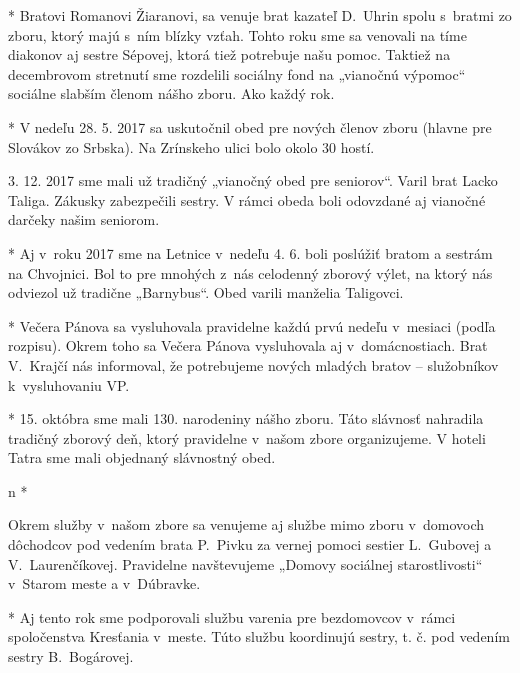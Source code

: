 * 
Bratovi Romanovi Žiaranovi, sa venuje brat kazateľ D.~Uhrin spolu s~bratmi zo zboru, ktorý majú s~ním blízky vzťah. Tohto roku sme sa venovali na tíme diakonov aj sestre Sépovej, ktorá tiež potrebuje našu pomoc.
Taktiež na decembrovom stretnutí sme rozdelili sociálny fond na „vianočnú výpomoc“ sociálne slabším členom nášho zboru. Ako každý rok.

* 
V nedeľu 28. 5. 2017 sa uskutočnil obed pre nových členov zboru (hlavne pre Slovákov zo Srbska). Na Zrínskeho ulici bolo okolo 30 hostí.

3. 12. 2017 sme mali už tradičný „vianočný obed pre seniorov“. Varil brat Lacko Taliga. Zákusky zabezpečili sestry. V rámci obeda boli odovzdané aj vianočné darčeky našim seniorom.

* 
Aj v~roku 2017 sme na Letnice v~nedeľu 4. 6.  boli poslúžiť bratom a sestrám na Chvojnici. Bol to pre mnohých z~nás celodenný zborový výlet, na ktorý nás odviezol už tradične „Barnybus“. Obed varili manželia Taligovci.

* 
Večera Pánova sa vysluhovala pravidelne každú prvú nedeľu v~mesiaci (podľa rozpisu). Okrem toho sa Večera Pánova vysluhovala aj v~domácnostiach. Brat V.~Krajčí nás informoval, že potrebujeme nových mladých bratov -- služobníkov k~vysluhovaniu VP.

* 
15. októbra sme mali 130. narodeniny nášho zboru. Táto slávnosť nahradila tradičný zborový deň, ktorý pravidelne v~našom zbore organizujeme. V hoteli Tatra sme mali objednaný slávnostný obed.
\enditems


\begitems \style n
* 

Okrem služby v~našom zbore sa venujeme aj službe mimo zboru v~domovoch dôchodcov pod vedením brata P.~Pivku za vernej pomoci sestier L.~Gubovej a V.~Laurenčíkovej. Pravidelne navštevujeme „Domovy sociálnej starostlivosti“ v~Starom meste a v~Dúbravke.

* 
Aj tento rok sme podporovali službu varenia pre bezdomovcov v~rámci spoločenstva Kresťania v~meste. Túto službu koordinujú sestry, t. č. pod vedením sestry B.~Bogárovej.
\enditems



